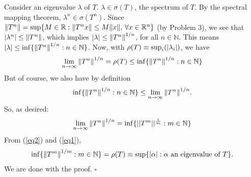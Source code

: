 \documentclass{article}
\begin{document}
Consider an eigenvalue $\lambda$ of $T$. $\lambda \in \sigma(T)$, the spectrum of $T$. By the spectral mapping theorem, $\lambda^n \in \sigma(T^n)$. Since $\norm{T^n} = \sup \{ M \in \mathbb{R} : \norm{T^nx} \leq M\norm{x},\,\forall x\in \mathbb{R}^n \}$ (by Problem 3), we see that $\abs{\lambda^n} \leq \norm{T^n}$, which implies $\abs{\lambda} \leq \norm{T^n}^{1/n}$, for all $n\in \mathbb{N}$. This means $\abs{\lambda} \leq \inf \{ \norm{T^n}^{1/n} : n\in \mathbb{N} \}$. Now, with $\rho(T) \equiv \sup_i(\abs{\lambda_i})$, we have 
\begin{align*}
\lim\limits_{n\to \infty}\norm{T^n}^{1/n} =  \rho(T) \leq \inf \{ \norm{T^n}^{1/n} : n\in \mathbb{N} \}
\end{align*}
But of course, we also have by definition
\begin{align*}
\inf \{ \norm{T^n}^{1/n} : n\in \mathbb{N} \} \leq \lim\limits_{n\to \infty}\norm{T^n}^{1/n}.
\end{align*}
So, as desired:
\begin{align}\label{eq1}
\lim\limits_{n\to \infty}\norm{T^n}^{1/n} = \inf \{  || T^m || ^\frac{1}{m} : m \in \mathbb{N} \}
\end{align}
From (\ref{eq2}) and (\ref{eq1}), 
\begin{align*}
\inf \{ \norm{T^m}^{1/m} : m \in \mathbb{N}  \} = \rho(T) \equiv \sup\{ \abs{\alpha} : \alpha \text{ an eigenvalue of } T  \}.
\end{align*}
We are done with the proof. \hfill $\square$
\end{document}
